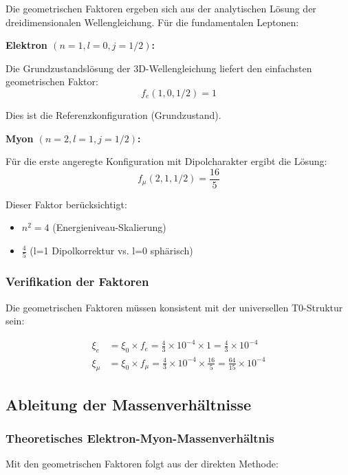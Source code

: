 Die geometrischen Faktoren ergeben sich aus der analytischen Lösung der dreidimensionalen Wellengleichung. Für die fundamentalen Leptonen:

\textbf{Elektron $(n=1, l=0, j=1/2)$:}

Die Grundzustandslösung der 3D-Wellengleichung liefert den einfachsten geometrischen Faktor:
\begin{equation}
	f_e(1,0,1/2) = 1
\end{equation}

Dies ist die Referenzkonfiguration (Grundzustand).

\textbf{Myon $(n=2, l=1, j=1/2)$:}

Für die erste angeregte Konfiguration mit Dipolcharakter ergibt die Lösung:
\begin{equation}
	f_\mu(2,1,1/2) = \frac{16}{5}
\end{equation}

Dieser Faktor berücksichtigt:
\begin{itemize}
	\item $n^2 = 4$ (Energieniveau-Skalierung)
	\item $\frac{4}{5}$ (l=1 Dipolkorrektur vs. l=0 sphärisch)
\end{itemize}

\subsubsection{Verifikation der Faktoren}

Die geometrischen Faktoren müssen konsistent mit der universellen T0-Struktur sein:

\begin{align}
	\xi_e &= \xi_0 \times f_e = \frac{4}{3} \times 10^{-4} \times 1 = \frac{4}{3} \times 10^{-4}\\
	\xi_\mu &= \xi_0 \times f_\mu = \frac{4}{3} \times 10^{-4} \times \frac{16}{5} = \frac{64}{15} \times 10^{-4}
\end{align}

\subsection{Ableitung der Massenverhältnisse}

\subsubsection{Theoretisches Elektron-Myon-Massenverhältnis}

Mit den geometrischen Faktoren folgt aus der direkten Methode:

